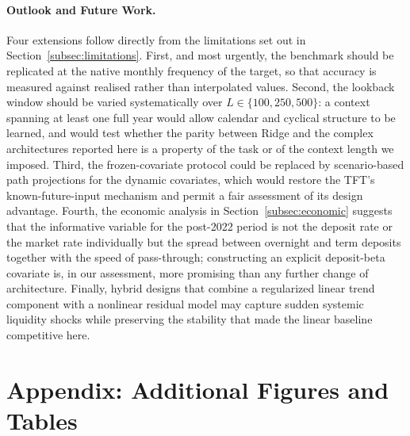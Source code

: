 \documentclass[11pt,a4paper]{article}
\begin{document}
\paragraph{Outlook and Future Work.}
Four extensions follow directly from the limitations set out in
Section~\ref{subsec:limitations}. First, and most urgently, the benchmark
should be replicated at the native monthly frequency of the target, so that
accuracy is measured against realised rather than interpolated values.
Second, the lookback window should be varied systematically over
$L \in \{100, 250, 500\}$: a context spanning at least one full year would
allow calendar and cyclical structure to be learned, and would test whether
the parity between Ridge and the complex architectures reported here is a
property of the task or of the context length we imposed. Third, the
frozen-covariate protocol could be replaced by scenario-based path projections
for the dynamic covariates, which would restore the TFT's
known-future-input mechanism and permit a fair assessment of its design
advantage. Fourth, the economic analysis in Section~\ref{subsec:economic}
suggests that the informative variable for the post-2022 period is not the
deposit rate or the market rate individually but the spread between overnight
and term deposits together with the speed of pass-through; constructing an
explicit deposit-beta covariate is, in our assessment, more promising than any
further change of architecture. Finally, hybrid designs that combine a
regularized linear trend component with a nonlinear residual model may capture
sudden systemic liquidity shocks while preserving the stability that made the
linear baseline competitive here.




\appendix
\section{Appendix: Additional Figures and Tables}
\label{app:additional}
\end{document}
